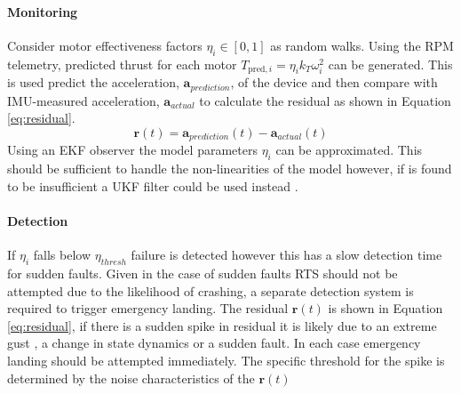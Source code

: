 \paragraph{Monitoring}
Consider motor effectiveness factors $\eta_i \in [0,1]$ as random walks. Using the \gls{RPM} telemetry, predicted thrust for each motor $T_{\text{pred},i} = \eta_i k_T \omega_i^2$ can be generated. This is used predict the acceleration, $\mathbf{a}_{prediction}$, of the device and then compare with IMU-measured acceleration,  $\mathbf{a}_{actual}$ to calculate the residual as shown in Equation \ref{eq:residual}. 
\begin{equation}\label{eq:residual}
    \mathbf{r}(t) = \mathbf{a}_{prediction}(t) - \mathbf{a}_{actual}(t)
\end{equation}
Using an \gls{EKF} observer the model parameters $\eta_i$ can be approximated. This should be sufficient to handle the non-linearities of the model however, if is found to be insufficient a \gls{UKF} filter could be used instead \cite{WAN2000}.
\paragraph{Detection}
If $\eta_i$ falls below $\eta_{thresh}$ failure is detected however this has a slow detection time for sudden faults. Given in the case of sudden faults \gls{RTS} should not be attempted due to the likelihood of crashing, a separate detection system is required to trigger emergency landing. The residual $\mathbf{r}(t)$ is shown in Equation \ref{eq:residual}, if there is a sudden spike in residual it is likely due to an extreme gust , a change in state dynamics or a sudden fault. In each case emergency landing should be attempted immediately. The specific threshold for the spike is determined by the noise characteristics of the $\mathbf{r}(t)$ %
\begin{comment}
\paragraph{Isolation}
This means that the system is vulnerable to multiple actuator faults as all others are assumed healthy. There are methods that can address this at the cost of extra complexity \cite{ZHANG2008}. Given that the probability of simultaneous partial faults is low these are not necessary for this application, however, common mode failures could be possible for example if in sand storm you would expect multiple faults.
\end{comment}
